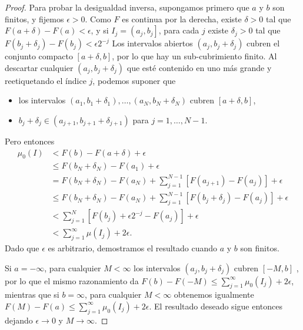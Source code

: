 \begin{proof}
Para probar la desigualdad inversa, supongamos primero que $a$ y $b$ son finitos, y fijemos $\epsilon>0$. Como $F$ es continua por la derecha, existe $\delta>0$ tal que $F(a+\delta)-F(a)<\epsilon$, y si $I_{j}=\left(a_{j} , b_{j}\right]$, para cada $j$ existe $\delta_{j}>0$ tal que $F\left(b_{j}+\delta_{j}\right)-F\left(b_{j}\right)<\epsilon 2^{-j}$ Los intervalos abiertos $\left(a_{j}, b_{j}+\delta_{j}\right)$ cubren el conjunto compacto $[a+\delta, b]$, por lo que hay un sub-cubrimiento finito. Al descartar cualquier $\left(a_{j}, b_{j}+\delta_{j}\right)$ que esté contenido en uno más grande y reetiquetando el índice $j$, podemos suponer que 
\begin{itemize}
\item  los intervalos $\left(a_{1}, b_{1}+\delta_{1}\right), \ldots,\left(a_{N}, b_{N}+\delta_{N}\right)$  cubren $[a+\delta, b]$,
\item  $b_{j}+\delta_{j} \in\left(a_{j+1}, b_{j+1}+\delta_{j+1}\right)$ para $j=1, \ldots , N-1$.
\end{itemize}
Pero entonces
$$
\begin{aligned}
\mu_{0}(I) &<F(b)-F(a+\delta)+\epsilon \\
& \leq F\left(b_{N}+\delta_{N}\right)-F\left(a_{1}\right)+\epsilon \\
&=F\left(b_{N}+\delta_{N}\right)-F\left(a_{N}\right)+\sum\limits_{j=1}^{N-1}\left[F\left( a_{j+1}\right)-F\left(a_{j}\right)\right]+\epsilon \\
& \leq F\left(b_{N}+\delta_{N}\right)-F\left(a_{N}\right)+\sum\limits_{j=1}^{N-1}\left[F\left (b_{j}+\delta_{j}\right)-F\left(a_{j}\right)\right]+\epsilon \\
&<\sum\limits_{j=1}^{N}\left[F\left(b_{j}\right)+\epsilon 2^{-j}-F\left(a_{j}\right)\right]+ \epsilon \\
&<\sum\limits_{j=1}^{\infty} \mu\left(I_{j}\right)+2 \epsilon .
\end{aligned}
$$
Dado que $\epsilon$ es arbitrario, demostramos el resultado cuando $a$ y $b$ son finitos. 

Si $a=-\infty$, para cualquier $M<\infty$ los intervalos $\left(a_{j}, b_{j}+\delta_{j}\right)$ cubren $[-M, b]$ , por lo que el mismo razonamiento da $F(b)-F(-M) \leq \sum\limits_{j=1}^{\infty} \mu_{0}\left(I_{j}\right)+2 \epsilon$, mientras que si $b=\infty$, para cualquier $M<\infty$ obtenemos igualmente $F(M)-F(a) \leq \sum\limits_{j=1}^{\infty} \mu_{0}\left( I_{j}\right)+2 \epsilon$. El resultado deseado sigue entonces dejando $\epsilon \rightarrow 0$ y $M \rightarrow \infty$.
\end{proof}


